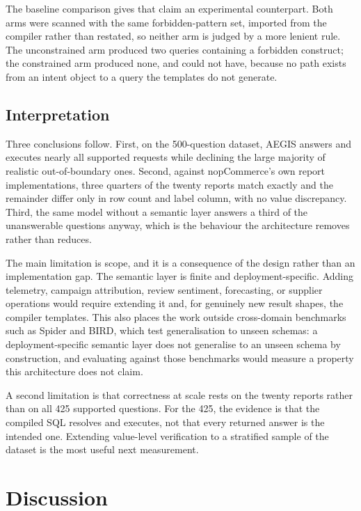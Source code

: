 \documentclass[pdflatex,sn-mathphys-num]{sn-jnl}
\begin{document}
The baseline comparison gives that claim an experimental counterpart. Both arms were scanned with the same forbidden-pattern set, imported from the compiler rather than restated, so neither arm is judged by a more lenient rule. The unconstrained arm produced two queries containing a forbidden construct; the constrained arm produced none, and could not have, because no path exists from an intent object to a query the templates do not generate.


\subsection{Interpretation}

Three conclusions follow. First, on the 500-question dataset, AEGIS answers and executes nearly all supported requests while declining the large majority of realistic out-of-boundary ones. Second, against nopCommerce's own report implementations, three quarters of the twenty reports match exactly and the remainder differ only in row count and label column, with no value discrepancy. Third, the same model without a semantic layer answers a third of the unanswerable questions anyway, which is the behaviour the architecture removes rather than reduces.


The main limitation is scope, and it is a consequence of the design rather than an implementation gap. The semantic layer is finite and deployment-specific. Adding telemetry, campaign attribution, review sentiment, forecasting, or supplier operations would require extending it and, for genuinely new result shapes, the compiler templates. This also places the work outside cross-domain benchmarks such as Spider and BIRD, which test generalisation to unseen schemas: a deployment-specific semantic layer does not generalise to an unseen schema by construction, and evaluating against those benchmarks would measure a property this architecture does not claim.


A second limitation is that correctness at scale rests on the twenty reports rather than on all 425 supported questions. For the 425, the evidence is that the compiled SQL resolves and executes, not that every returned answer is the intended one. Extending value-level verification to a stratified sample of the dataset is the most useful next measurement.


\section{Discussion}
\end{document}
